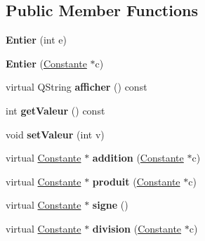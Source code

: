 \subsection*{\-Public \-Member \-Functions}
\begin{DoxyCompactItemize}
\item 
\hypertarget{class_entier_a35115c0f47f2d94e1697e20624a1c4d1}{{\bfseries \-Entier} (int e)}\label{class_entier_a35115c0f47f2d94e1697e20624a1c4d1}

\item 
\hypertarget{class_entier_a94158ae6fbad4c9a74815716f5f0f629}{{\bfseries \-Entier} (\hyperlink{class_constante}{\-Constante} $\ast$c)}\label{class_entier_a94158ae6fbad4c9a74815716f5f0f629}

\item 
\hypertarget{class_entier_adc0a7554faa45a68eb7432798b6892cc}{virtual \-Q\-String {\bfseries afficher} () const }\label{class_entier_adc0a7554faa45a68eb7432798b6892cc}

\item 
\hypertarget{class_entier_afe38ee7f81afc3c88a2c774ff0af2bcd}{int {\bfseries get\-Valeur} () const }\label{class_entier_afe38ee7f81afc3c88a2c774ff0af2bcd}

\item 
\hypertarget{class_entier_a22e1c5d0ecf304cd6033e6bf453cc0c1}{void {\bfseries set\-Valeur} (int v)}\label{class_entier_a22e1c5d0ecf304cd6033e6bf453cc0c1}

\item 
\hypertarget{class_entier_ab093dd3f0aa7777c4300362f7ba78ff4}{virtual \hyperlink{class_constante}{\-Constante} $\ast$ {\bfseries addition} (\hyperlink{class_constante}{\-Constante} $\ast$c)}\label{class_entier_ab093dd3f0aa7777c4300362f7ba78ff4}

\item 
\hypertarget{class_entier_aa83349a1b984adbd53766ebac2614faf}{virtual \hyperlink{class_constante}{\-Constante} $\ast$ {\bfseries produit} (\hyperlink{class_constante}{\-Constante} $\ast$c)}\label{class_entier_aa83349a1b984adbd53766ebac2614faf}

\item 
\hypertarget{class_entier_a36ce54a35fc9ab69bef2cffebee01c69}{virtual \hyperlink{class_constante}{\-Constante} $\ast$ {\bfseries signe} ()}\label{class_entier_a36ce54a35fc9ab69bef2cffebee01c69}

\item 
\hypertarget{class_entier_afc338f1f177942411a3c8e0e19fce6ce}{virtual \hyperlink{class_constante}{\-Constante} $\ast$ {\bfseries division} (\hyperlink{class_constante}{\-Constante} $\ast$c)}\label{class_entier_afc338f1f177942411a3c8e0e19fce6ce}


\end{DoxyCompactItemize}
